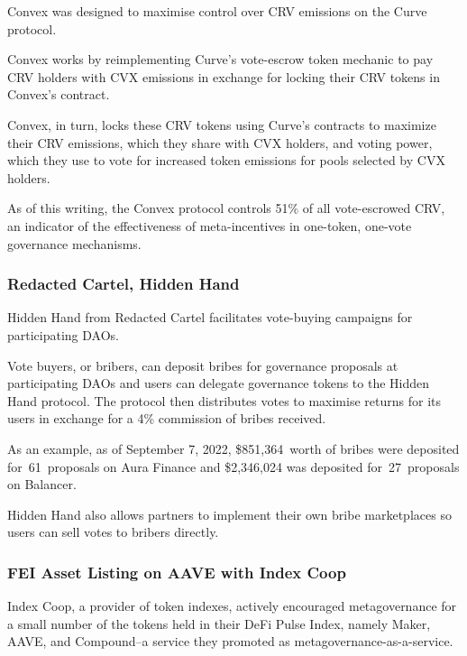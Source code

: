 \documentclass[
]{article}
\begin{document}
Convex was designed to maximise control over CRV emissions on the Curve
protocol.

Convex works by reimplementing Curve's vote-escrow token mechanic to pay
CRV holders with CVX emissions in exchange for locking their CRV tokens
in Convex's contract.

Convex, in turn, locks these CRV tokens using Curve's contracts to
maximize their CRV emissions, which they share with CVX holders, and
voting power, which they use to vote for increased token emissions for
pools selected by CVX holders.

As of this writing, the Convex protocol controls 51\% of all
vote-escrowed CRV, an indicator of the effectiveness of meta-incentives
in one-token, one-vote governance mechanisms.

\hypertarget{redacted-cartel-hidden-hand}{%
\subsubsection{Redacted Cartel, Hidden
Hand}\label{redacted-cartel-hidden-hand}}

Hidden Hand from Redacted Cartel facilitates vote-buying campaigns for
participating DAOs.

Vote buyers, or bribers, can deposit bribes for governance proposals at
participating DAOs and users can delegate governance tokens to the
Hidden Hand protocol. The protocol then distributes votes to maximise
returns for its users in exchange for a 4\% commission of bribes
received.

As an example, as of September 7, 2022, \$851,364~worth of bribes were
deposited for~61~proposals on Aura Finance and \$2,346,024 was deposited
for~27~proposals on Balancer.

Hidden Hand also allows partners to implement their own bribe
marketplaces so users can sell votes to bribers directly.

\hypertarget{fei-asset-listing-on-aave-with-index-coop}{%
\subsubsection{FEI Asset Listing on AAVE with Index
Coop}\label{fei-asset-listing-on-aave-with-index-coop}}

Index Coop, a provider of token indexes, actively encouraged
metagovernance for a small number of the tokens held in their DeFi Pulse
Index, namely Maker, AAVE, and Compound--a service they promoted as
metagovernance-as-a-service.
\end{document}

